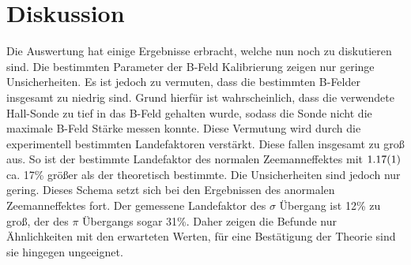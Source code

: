 
\section{Diskussion}
\label{sec:Diskussion}
Die Auswertung hat einige Ergebnisse erbracht, welche nun noch zu diskutieren sind. Die bestimmten Parameter der B-Feld Kalibrierung zeigen nur geringe Unsicherheiten. Es ist jedoch zu vermuten, dass die bestimmten B-Felder insgesamt zu niedrig sind. Grund hierfür ist wahrscheinlich, dass die verwendete Hall-Sonde zu tief in das B-Feld gehalten wurde, sodass die Sonde nicht die maximale B-Feld Stärke messen konnte. %
Diese Vermutung wird durch die experimentell bestimmten Landefaktoren verstärkt. Diese fallen insgesamt zu groß aus. So ist der bestimmte Landefaktor des normalen Zeemanneffektes mit $\num1.17(1) $ ca. 17\% größer als der theoretisch bestimmte. Die Unsicherheiten sind jedoch nur gering. Dieses Schema setzt sich bei den Ergebnissen des anormalen Zeemanneffektes fort.  Der gemessene Landefaktor des $\sigma$ Übergang ist 12\% zu groß, der des $\pi$ Übergangs sogar 31\%. Daher zeigen die Befunde nur Ähnlichkeiten mit den erwarteten Werten, für eine Bestätigung der Theorie sind sie hingegen ungeeignet.